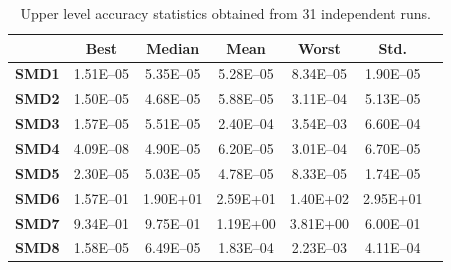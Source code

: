 \documentclass[conference]{IEEEtran}
\begin{document}
\begin{table}[!ht]
\renewcommand{\arraystretch}{1.3}
    \caption{Upper level accuracy statistics obtained from 31 independent runs.}
    \label{tab:ul-accuracy}
    \centering
    \begin{tabular}{|c|c|c|c|c|c|c|}
\hline
&\textbf{Best}&\textbf{Median}&\textbf{Mean}&\textbf{Worst}&\textbf{Std.}\\ \hline 
\textbf{SMD1} & 1.51E--05 & 5.35E--05 & 5.28E--05 & 8.34E--05 & 1.90E--05 \\ \hline 
\textbf{SMD2} & 1.50E--05 & 4.68E--05 & 5.88E--05 & 3.11E--04 & 5.13E--05 \\ \hline 
\textbf{SMD3} & 1.57E--05 & 5.51E--05 & 2.40E--04 & 3.54E--03 & 6.60E--04 \\ \hline 
\textbf{SMD4} & 4.09E--08 & 4.90E--05 & 6.20E--05 & 3.01E--04 & 6.70E--05 \\ \hline 
\textbf{SMD5} & 2.30E--05 & 5.03E--05 & 4.78E--05 & 8.33E--05 & 1.74E--05 \\ \hline 
\textbf{SMD6} & 1.57E--01 &  1.90E+01 &  2.59E+01 &  1.40E+02 &  2.95E+01 \\ \hline 
\textbf{SMD7} & 9.34E--01 & 9.75E--01 &  1.19E+00 &  3.81E+00 & 6.00E--01 \\ \hline 
\textbf{SMD8} & 1.58E--05 & 6.49E--05 & 1.83E--04 & 2.23E--03 & 4.11E--04 \\ \hline 
    \end{tabular}
\end{table}
\end{document}
